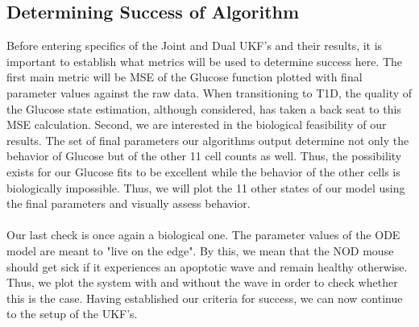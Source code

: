 \subsection{Determining Success of Algorithm}
Before entering specifics of the Joint and Dual UKF's and their results, it is important to establish what metrics will be used to determine success here. The first main metric will be MSE of the Glucose function plotted with final parameter values against the raw data. When transitioning to T1D, the quality of the Glucose state estimation, although considered, has taken a back seat to this MSE calculation. Second, we are interested in the biological feasibility of our results. The set of final parameters our algorithms output determine not only the behavior of Glucose but of the other 11 cell counts as well. Thus, the possibility exists for our Glucose fits to be excellent while the behavior of the other cells is biologically impossible. Thus, we will plot the 11 other states of our model using the final parameters and visually assess behavior. \\
\\
Our last check is once again a biological one. The parameter values of the ODE model are meant to "live on the edge". By this, we mean that the NOD mouse should get sick if it experiences an apoptotic wave and remain healthy otherwise. Thus, we plot the system with and without the wave in order to check whether this is the case. Having established our criteria for success, we can now continue to the setup of the UKF's.


